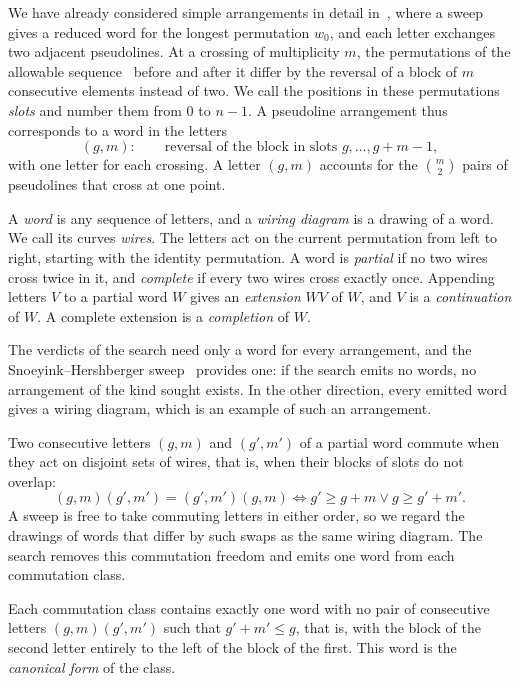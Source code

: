 We have already considered simple arrangements in detail in~\cite[Subsection~2.1]{pu26b}, where a sweep gives a reduced word for the longest permutation $w_0$, and each letter exchanges two adjacent pseudolines.
At a crossing of multiplicity $m$, the permutations of the allowable sequence~\cite{gp93} before and after it differ by the reversal of a block of $m$ consecutive elements instead of two.
We call the positions in these permutations \emph{slots} and number them from $0$ to $n-1$.
A pseudoline arrangement thus corresponds to a word in the letters
\begin{equation}\label{eq:letter}
(g,m):\qquad \text{reversal of the block in slots } g,\ldots,g+m-1,
\end{equation}
with one letter for each crossing.
A letter $(g,m)$ accounts for the $\binom m2$ pairs of pseudolines that cross at one point.

A \emph{word} is any sequence of letters, and a \emph{wiring diagram} is a drawing of a word. We call its curves \emph{wires}.
The letters act on the current permutation from left to right, starting with the identity permutation.
A word is \emph{partial} if no two wires cross twice in it, and \emph{complete} if every two wires cross exactly once.
Appending letters $V$ to a partial word $W$ gives an \emph{extension} $WV$ of $W$, and $V$ is a \emph{continuation} of $W$.
A complete extension is a \emph{completion} of $W$.

The verdicts of the search need only a word for every arrangement, and the Snoeyink--Hershberger sweep~\cite{sh89} provides one: if the search emits no words, no arrangement of the kind sought exists.
In the other direction, every emitted word gives a wiring diagram, which is an example of such an arrangement.

Two consecutive letters $(g,m)$ and $(g',m')$ of a partial word commute when they act on disjoint sets of wires, that is, when their blocks of slots do not overlap:
\begin{equation}\label{eq:mult-commut}
(g,m)(g',m') = (g',m')(g,m)\iff g'\geq g+m \lor g \geq g'+m'.
\end{equation}
A sweep is free to take commuting letters in either order, so we regard the drawings of words that differ by such swaps as the same wiring diagram.
The search removes this commutation freedom and emits one word from each commutation class.

\begin{lemma}\label{lem:canonical}
Each commutation class contains exactly one word with no pair of consecutive letters $(g,m)(g',m')$ such that $g'+m'\le g$, that is, with the block of the second letter entirely to the left of the block of the first. This word is the \emph{canonical form} of the class.
\end{lemma}

